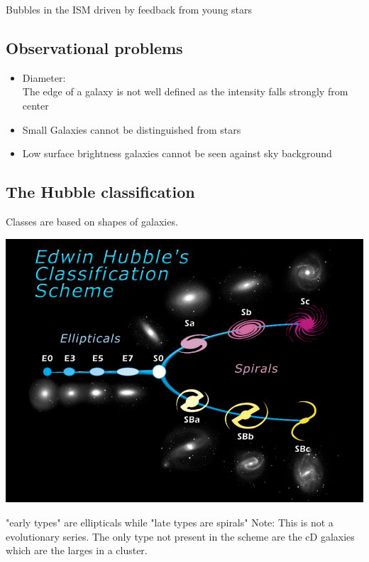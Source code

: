 \documentclass[11pt,a4paper]{article}
\begin{document}
Bubbles in the ISM driven by feedback from young stars

\subsection{Observational problems}

\begin{itemize}
   \item Diameter: \\ 
       The edge of a galaxy is not well defined as the intensity falls strongly from center
   \item Small Galaxies cannot be distinguished
from stars
\item Low surface brightness galaxies cannot be
seen against sky background
\end{itemize}
\subsection{The Hubble classification}
Classes are based on shapes of galaxies.
\begin{center}
    \includegraphics[width=0.8\linewidth]{screenshot_2024-01-24-120628.png}
\end{center}
"early types" are ellipticals while "late types are spirals"
Note: This is not a evolutionary series. 
The only type not present in the scheme are the cD galaxies which are the larges in a cluster. 
\end{document}
